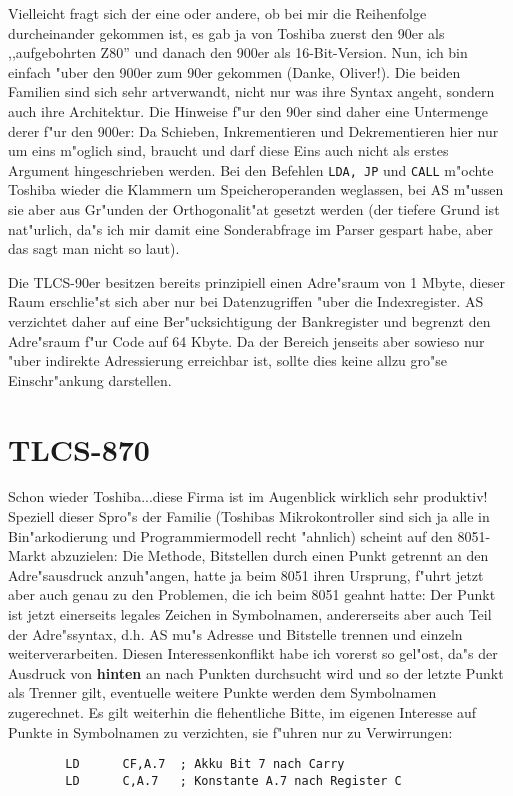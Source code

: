 \documentclass[12pt,a4paper,twoside]{report}
\newcommand{\bb}[1]{{\bf #1}}
\newcommand{\tty}[1]{{\tt #1}}
\begin{document}
Vielleicht fragt sich der eine oder andere, ob bei mir die Reihenfolge
durcheinander gekommen ist, es gab ja von Toshiba zuerst den 90er als
,,aufgebohrten Z80'' und danach den 900er als 16-Bit-Version.  Nun, ich
bin einfach "uber den 900er zum 90er gekommen (Danke, Oliver!).  Die
beiden Familien sind sich sehr artverwandt, nicht nur was ihre Syntax
angeht, sondern auch ihre Architektur.  Die Hinweise f"ur den 90er sind
daher eine Untermenge derer f"ur den 900er: Da Schieben, Inkrementieren
und Dekrementieren hier nur um eins m"oglich sind, braucht und darf diese
Eins auch nicht als erstes Argument hingeschrieben werden.  Bei den
Befehlen \tty{LDA, JP} und \tty{CALL} m"ochte Toshiba wieder die
Klammern um Speicheroperanden weglassen, bei AS m"ussen sie aber aus
Gr"unden der Orthogonalit"at gesetzt werden (der tiefere Grund ist
nat"urlich, da"s ich mir damit eine Sonderabfrage im Parser gespart habe,
aber das sagt man nicht so laut).
\par
Die TLCS-90er besitzen bereits prinzipiell einen Adre"sraum von 1
Mbyte, dieser Raum erschlie"st sich aber nur bei Datenzugriffen "uber
die Indexregister.  AS verzichtet daher auf eine Ber"ucksichtigung
der Bankregister und begrenzt den Adre"sraum f"ur Code auf 64 Kbyte.
Da der Bereich jenseits aber sowieso nur "uber indirekte Adressierung
erreichbar ist, sollte dies keine allzu gro"se Einschr"ankung darstellen.


\section{TLCS-870}

Schon wieder Toshiba...diese Firma ist im Augenblick wirklich sehr
produktiv!  Speziell dieser Spro"s der Familie (Toshibas Mikrokontroller
sind sich ja alle in Bin"arkodierung und Programmiermodell recht "ahnlich)
scheint auf den 8051-Markt abzuzielen: Die Methode, Bitstellen durch einen
Punkt getrennt an den Adre"sausdruck anzuh"angen, hatte ja beim 8051 ihren
Ursprung, f"uhrt jetzt aber auch genau zu den Problemen, die ich beim 8051
geahnt hatte: Der Punkt ist jetzt einerseits legales Zeichen in Symbolnamen,
andererseits aber auch Teil der Adre"ssyntax, d.h. AS mu"s Adresse und
Bitstelle trennen und einzeln weiterverarbeiten.  Diesen Interessenkonflikt
habe ich vorerst so gel"ost, da"s der Ausdruck von \bb{hinten} an nach
Punkten durchsucht wird und so der letzte Punkt als Trenner gilt, eventuelle
weitere Punkte werden dem Symbolnamen zugerechnet.  Es gilt weiterhin die
flehentliche Bitte, im eigenen Interesse auf Punkte in Symbolnamen zu
verzichten, sie f"uhren nur zu Verwirrungen:
\begin{verbatim}
        LD      CF,A.7  ; Akku Bit 7 nach Carry
        LD      C,A.7   ; Konstante A.7 nach Register C
\end{verbatim}
\end{document}
